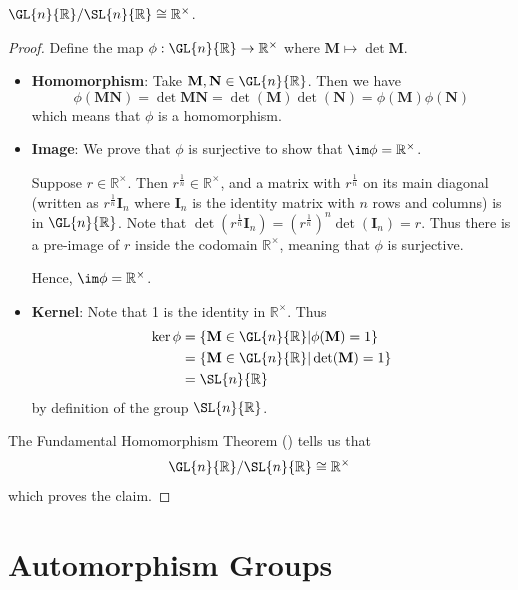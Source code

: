 \begin{proposition}
    $\GL{n}{\mathbb{R}} / \SL{n}{\mathbb{R}} \cong \mathbb{R}^\times$.
\end{proposition}
\begin{proof}
    Define the map $\phi: \GL{n}{\mathbb{R}} \to \mathbb{R}^\times$ where $\textbf{M} \mapsto \det\textbf{M}$.
	\begin{itemize}
	    \item \textbf{Homomorphism}: Take $\textbf{M}, \textbf{N} \in \GL{n}{\mathbb{R}}$. Then we have
	    \[
	        \phi(\textbf{MN}) = \det \textbf{MN} = \det(\textbf{M})\det(\textbf{N}) = \phi(\textbf{M})\phi(\textbf{N})
	    \]
	    which means that $\phi$ is a homomorphism.

	    \item \textbf{Image}: We prove that $\phi$ is surjective to show that $\im \phi = \mathbb{R}^\times$.

	    Suppose $r \in \mathbb{R}^\times$. Then $r^{\frac1n} \in \mathbb{R}^\times$, and a matrix with $r^{\frac1n}$ on its main diagonal (written as $r^{\frac1n}\textbf{I}_n$ where $\textbf{I}_n$ is the identity matrix with $n$ rows and columns) is in $\GL{n}{\mathbb{R}}$. Note that $\det(r^{\frac1n}\textbf{I}_n) = \left(r^{\frac1n}\right)^n\det(\textbf{I}_n) = r$. Thus there is a pre-image of $r$ inside the codomain $\mathbb{R}^\times$, meaning that $\phi$ is surjective.

	    Hence, $\im \phi = \mathbb{R}^\times$.

	    \item \textbf{Kernel}: Note that 1 is the identity in $\mathbb{R}^\times$. Thus
	    \begin{align*}
	        \ker\phi &= \{\textbf{M} \in \GL{n}{\mathbb{R}} \vert \phi(\textbf{M}) = 1\} \\
	        &= \{\textbf{M} \in \GL{n}{\mathbb{R}} \vert \det(\textbf{M}) = 1\}\\
	        &= \SL{n}{\mathbb{R}}
	    \end{align*}
	    by definition of the group $\SL{n}{\mathbb{R}}$.
	\end{itemize}
	The Fundamental Homomorphism Theorem () tells us that
	\[
	    \GL{n}{\mathbb{R}} / \SL{n}{\mathbb{R}} \cong \mathbb{R}^\times
	\]
	which proves the claim.
\end{proof}

\section{Automorphism Groups}
